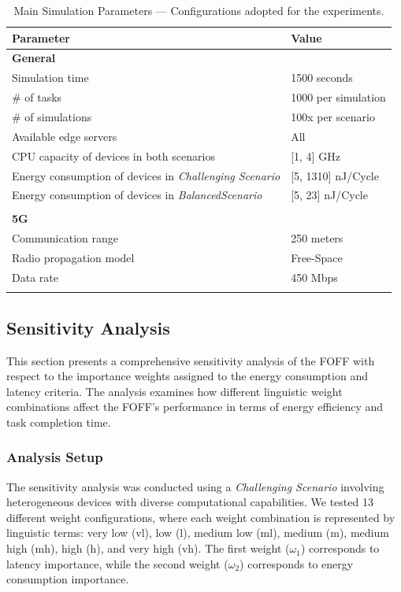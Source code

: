 \documentclass[iicol]{sn-jnl}
\begin{document}
\begin{table}[ht!]
    \centering
    \caption{Main Simulation Parameters --- Configurations adopted for the experiments.}
    \label{tab_simulation_parameters}
    \begin{tabular}{p{\twocolumns}l}
    \toprule
    \textbf{Parameter} & \textbf{Value} \\
    \midrule
    \textbf{General} \\
    Simulation time & 1500 seconds \\
    \# of tasks & 1000 per simulation \\
    \# of simulations & 100x per scenario \\ 
    Available edge servers & All \\ 
    CPU capacity of devices in both scenarios & [1, 4] GHz \\
    Energy consumption of devices in \textit{Challenging Scenario} & [5, 1310] nJ/Cycle \\
    Energy consumption of devices in \textit{BalancedScenario} & [5, 23] nJ/Cycle \\
    \\
    \textbf{5G} \\
    Communication range & 250 meters \\ 
    Radio propagation model & Free-Space \\
    Data rate & 450 Mbps \\
    \botrule
    \end{tabular}
\end{table}

\subsection{Sensitivity Analysis}\label{sec_sensitive_analysis}

This section presents a comprehensive sensitivity analysis of the FOFF with respect to the importance weights assigned to the energy consumption and latency criteria. The analysis examines how different linguistic weight combinations affect the FOFF's performance in terms of energy efficiency and task completion time.

\subsubsection{Analysis Setup}

The sensitivity analysis was conducted using a \textit{Challenging Scenario} involving heterogeneous devices with diverse computational capabilities. We tested 13 different weight configurations, where each weight combination is represented by linguistic terms: very low (vl), low (l), medium low (ml), medium (m), medium high (mh), high (h), and very high (vh). The first weight ($\omega_1$) corresponds to latency importance, while the second weight ($\omega_2$) corresponds to energy consumption importance.
\end{document}
